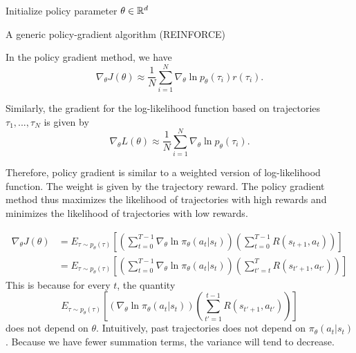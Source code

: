 \begin{refsection}
\begin{algorithm}
	Initialize policy parameter $\theta\in \mathbb{R}^d$\\
	\caption{A generic policy-gradient algorithm (REINFORCE)}
\end{algorithm}


\begin{remark}
	In the policy gradient method, we have
	$$\nabla_{\theta}J(\theta) \approx \frac{1}{N}\sum_{i=1}^{N}\nabla_{\theta} \ln p_\theta(\tau_i)r(\tau_i).$$	
	
	Similarly, the gradient for the log-likelihood function based on trajectories $\tau_1,...,\tau_N$ is given by
	$$\nabla_{\theta}L(\theta) \approx \frac{1}{N}\sum_{i=1}^{N}\nabla_{\theta} \ln p_\theta(\tau_i).$$	
	
	Therefore, policy gradient is similar to a weighted version of log-likelihood function. The weight is given by the trajectory reward. The policy gradient method thus maximizes the likelihood of trajectories with high rewards and minimizes the likelihood of trajectories with low rewards.
\end{remark}


\begin{remark}
	\begin{align*}
	\nabla_{\theta}J(\theta) &= E_{\tau\sim p_\theta(\tau)}[(\sum_{t=0}^{T-1} \nabla_{\theta} \ln \pi_{\theta}(a_t|s_t))(\sum_{t=0}^{T-1}R(s_{t+1},a_t))] \\
	&= E_{\tau\sim p_\theta(\tau)}[(\sum_{t=0}^{T-1} \nabla_{\theta} \ln \pi_{\theta}(a_t|s_t))(\sum_{t'=t}^{T}R(s_{t'+1},a_{t'}))] 
	\end{align*}	
	This is because for every $t$, the quantity
	$$E_{\tau\sim p_\theta(\tau)}[( \nabla_{\theta} \ln \pi_{\theta}(a_t|s_t))(\sum_{t'=1}^{t-1}R(s_{t'+1},a_{t'}))]$$
	does not depend on $\theta$. Intuitively, past trajectories does not depend on $\pi_\theta(a_t|s_t)$. Because we have fewer summation terms, the variance will tend to decrease. 
	

\end{remark}
\end{refsection}
